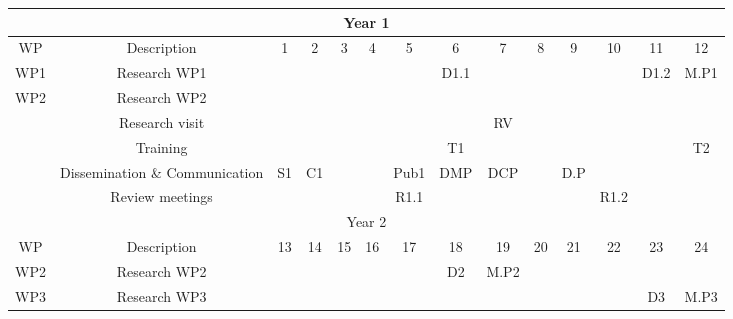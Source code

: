 \documentclass[a4paper,11pt]{scrartcl}
\begin{document}
\setlength\extrarowheight{3pt}
\begin{table}[h!]
    \centering
     \addtolength{\tabcolsep}{-3pt}
     \fontsize{10pt}{11pt}\selectfont
    \begin{tabular}{|c|c|c|c|c|c|c|c|c|c|c|c|c|c|}
    \hline
    \multicolumn{14}{|c|}{\cellcolor{gray!50} Year 1} \\
    \hline
    WP & Description & 1 & 2 & 3 & 4 & 5 & 6 & 7 & 8 & 9 & 10 & 11 & 12 \\
    \hline
    WP1 & Research WP1 & \cellcolor{blue!25} & \cellcolor{blue!25}& \cellcolor{blue!25} & \cellcolor{blue!25} & \cellcolor{blue!25} & \cellcolor{blue!25} D1.1 & \cellcolor{purple!25} & \cellcolor{purple!25} & \cellcolor{purple!25} & \cellcolor{purple!25} & \cellcolor{purple!25} D1.2 & \cellcolor{violet!50} M.P1\\
     \hline
    WP2 & Research WP2 & & & & & & & \cellcolor{green!25}& \cellcolor{green!25}& \cellcolor{green!25} & \cellcolor{green!25} & \cellcolor{green!25} & \cellcolor{green!25}\\
    \hline
     & Research visit & & & & & & & \cellcolor{green!25} RV &  &  & & &\\
    \hline
     & Training &  &  & \cellcolor{blue!25} & \cellcolor{blue!25} & \cellcolor{blue!25} & \cellcolor{blue!25} T1 & \cellcolor{brown!25}  & \cellcolor{brown!25} & \cellcolor{brown!25} & \cellcolor{brown!25} & \cellcolor{brown!25} &  \cellcolor{brown!25} T2\\
    \hline
      & Dissemination \& Communication & \cellcolor{gray!25} S1 & \cellcolor{gray!25} C1 & & & \cellcolor{gray!25} Pub1 & \cellcolor{gray!25}  DMP & \cellcolor{gray!25}  DCP & \cellcolor{blue!25} & \cellcolor{blue!25} D.P & & &\\
    \hline
     & Review meetings & & & &  & \cellcolor{blue!25} R1.1 & & & &  &  \cellcolor{purple!25} R1.2 & &\\
        \hline
    \multicolumn{14}{|c|}{\cellcolor{gray!50}Year 2} \\
    \hline
    WP & Description & 13 & 14 & 15 & 16 & 17 & 18 & 19 & 20 & 21 & 22 & 23 & 24\\
    \hline
    WP2 & Research WP2 & \cellcolor{green!25} & \cellcolor{green!25} & \cellcolor{green!25} & \cellcolor{green!25} & \cellcolor{green!25} & \cellcolor{green!25} D2 & \cellcolor{green!50} M.P2 & & & & &\\
    \hline
    WP3 & Research WP3 & & & & & &\cellcolor{orange!50} & \cellcolor{orange!50} & \cellcolor{orange!50} & \cellcolor{orange!50}& \cellcolor{orange!50}& \cellcolor{orange!50} D3 & \cellcolor{orange!75} M.P3\\

\end{tabular}
\end{table}
\end{document}
